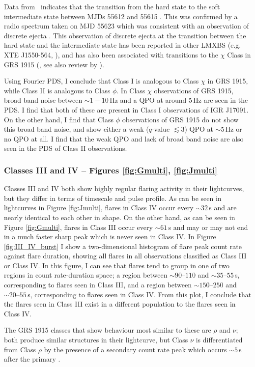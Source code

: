 \par Data from \rxte\  indicates that the transition from the hard state to the soft intermediate state between MJDs 55612 and 55615 \citep{Drave_Return}.  This was confirmed by a radio spectrum taken on MJD 55623 which was consistent with an observation of discrete ejecta \citep{Rodriguez_D}.  This observation of discrete ejecta at the transition between the hard state and the intermediate state has been reported in other LMXBS (e.g. XTE J1550-564, \citealp{Rodriguez_XTE}), and has also been associated with transitions to the $\chi$ Class in GRS 1915 (\citealp{Rodriguez_Ejection}, see also review by \citealp{Fender_Jets}).

\par Using Fourier PDS, I conclude that Class I is analogous to Class $\chi$ in GRS 1915, while Class II is analogous to Class $\phi$.  In Class $\chi$ observations of GRS 1915, broad band noise between $\sim1-10$\,Hz and a QPO at around 5\,Hz are seen in the PDS.  I find that both of these are present in Class I observations of IGR J17091.  On the other hand, I find that Class $\phi$ observations of GRS 1915 do not show this broad band noise, and show either a weak ($q$-value $\lesssim 3$) QPO at $\sim5$\,Hz or no QPO at all.  I find that the weak QPO and lack of broad band noise are also seen in the PDS of Class II observations.

\subsubsection{Classes III and IV -- Figures \ref{fig:Gmulti}, \ref{fig:Jmulti}}

\par Classes III and IV both show highly regular flaring activity in their lightcurves, but they differ in terms of timescale and pulse profile.  As can be seen in lightcurves in Figure \ref{fig:Jmulti}, flares in Class IV occur every $\sim32$\,s and are nearly identical to each other in shape.  On the other hand, as can be seen in Figure \ref{fig:Gmulti}, flares in Class III occur every $\sim61$\,s and may or may not end in a much faster sharp peak which is never seen in Class IV.  In Figure \ref{fig:III_IV_burst} I show a two-dimensional histogram of flare peak count rate against flare duration, showing all flares in all observations classified as Class III or Class IV.  In this figure, I can see that flares tend to group in one of two regions in count rate-duration space; a region between $\sim90\mbox{--}110$ \spcu and $\sim35\mbox{--}55$\,s, corresponding to flares seen in Class III, and a region between $\sim150\mbox{--}250$ \spcu and $\sim20\mbox{--}55$\,s, corresponding to flares seen in Class IV.  From this plot, I conclude that the flares seen in Class III exist in a different population to the flares seen in Class IV.
\par The GRS 1915 classes that show behaviour most similar to these are $\rho$ and $\nu$; both produce similar structures in their lightcurve, but Class $\nu$ is differentiated from Class $\rho$ by the presence of a secondary count rate peak which occurs $\sim5$\,s after the primary \citep{Belloni_GRS_MI}.

